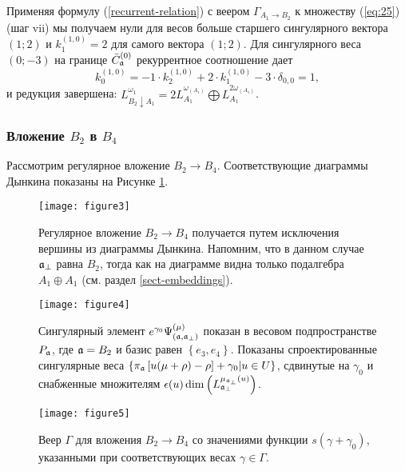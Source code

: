 Применяя формулу (\ref{recurrent-relation}) с веером
$\Gamma_{A_1\to B_2}$ к множеству (\ref{eq:25}) (шаг vii)
мы получаем нули для весов больше старшего сингулярного вектора$(1;2)$ и  $k^{(1,0)}_1=2$ для самого вектора $(1;2)$.
Для сингулярного веса $(0;-3)$ на границе $\bar{C}^{(0)}_{\mathfrak{a}}$ рекуррентное соотношение дает
\begin{equation*}
  \label{eq:23}
  k^{(1,0)}_{0}=-1\cdot k^{(1,0)}_2 +2\cdot k^{(1,0)}_1 - 3\cdot \delta_{0,0} = 1,
\end{equation*}
и редукция завершена: $L_{B_2\downarrow A_1}^{\omega_1}=
2L_{A_1}^{\omega_{\left(A_1\right)} }
\bigoplus
L_{A_1}^{2\omega_{\left(A_1\right)} }$.

\subsubsection{Вложение  $B_2$ в $B_4$}
\label{sec:someth-high-dimens}
Рассмотрим регулярное вложение $B_2 \rightarrow B_4$. Соответствующие диаграммы Дынкина показаны на Рисунке \ref{fig:dynkin}.
\begin{figure}[h]
  \centering
  \texttt{[image: figure3]}
  \caption{Регулярное вложение  $B_2 \rightarrow B_4$ получается путем исключения вершины из диаграммы Дынкина. 
    Напомним, что в данном случае $\mathfrak{a}_{\perp}$ равна $B_2$, тогда как на диаграмме видна только подалгебра $A_1\oplus A_1$ (см. раздел \ref{sect-embeddings}).}
  \label{fig:dynkin}
\end{figure}

\begin{figure}[pt]
  \centering
    \texttt{[image: figure4]}
  \caption{Сингулярный элемент  $e^{\gamma_0}\Psi ^{\left( \mu \right) }_{\left(  \mathfrak{a}, \mathfrak{a}_{\perp} \right)}$ показан в весовом подпространстве $P_{\mathfrak{a}}$, где $\mathfrak{a}=B_2$ и базис равен $\left\{e_3,e_4\right\}$. Показаны спроектированные сингулярные веса $\left\{\pi _{\mathfrak{a}}\left[ u(\mu +\rho )-\rho \right] +\gamma_0 | u \in U \right\}$, сдвинутые на  $\gamma_0$ и снабженные множителям  $\epsilon(u)\dim\left(L_{\mathfrak{a}_{\perp }}^{\mu_{\mathfrak{a}_{\perp }}\left( u\right) }\right)$.}
  \label{fig:B4B2anom}

%
  \centering
  \texttt{[image: figure5]}
  \caption{Веер $\Gamma$ для вложения $B_2\rightarrow B_4$ со значениями функции $s(\gamma+\gamma_0)$, указанными при соответствующих весах $\gamma \in \Gamma$.}
  \label{fig:B4B2Fan}
\end{figure}

